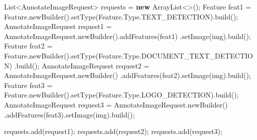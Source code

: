 \documentclass[
]{article}
\newenvironment{Shaded}{}{}
\newcommand{\BuiltInTok}[1]{\textcolor[rgb]{0.00,0.50,0.00}{#1}}
\newcommand{\FunctionTok}[1]{\textcolor[rgb]{0.02,0.16,0.49}{#1}}
\newcommand{\KeywordTok}[1]{\textcolor[rgb]{0.00,0.44,0.13}{\textbf{#1}}}
\newcommand{\NormalTok}[1]{#1}
\newcommand{\OperatorTok}[1]{\textcolor[rgb]{0.40,0.40,0.40}{#1}}
\begin{document}
\begin{Shaded}
\begin{Highlighting}[]
\BuiltInTok{List}\OperatorTok{\textless{}}\NormalTok{AnnotateImageRequest}\OperatorTok{\textgreater{}}\NormalTok{ requests }\OperatorTok{=} \KeywordTok{new} \BuiltInTok{ArrayList}\OperatorTok{\textless{}\textgreater{}();}
\NormalTok{Feature feat1 }\OperatorTok{=}\NormalTok{ Feature}\OperatorTok{.}\FunctionTok{newBuilder}\OperatorTok{().}\FunctionTok{setType}\OperatorTok{(}\NormalTok{Feature}\OperatorTok{.}\FunctionTok{Type}\OperatorTok{.}\FunctionTok{TEXT\_DETECTION}\OperatorTok{).}\FunctionTok{build}\OperatorTok{();}
\NormalTok{AnnotateImageRequest request1 }\OperatorTok{=}
\NormalTok{        AnnotateImageRequest}\OperatorTok{.}\FunctionTok{newBuilder}\OperatorTok{().}\FunctionTok{addFeatures}\OperatorTok{(}\NormalTok{feat1}\OperatorTok{)}
             \OperatorTok{.}\FunctionTok{setImage}\OperatorTok{(}\NormalTok{img}\OperatorTok{).}\FunctionTok{build}\OperatorTok{();}
\NormalTok{Feature feat2 }\OperatorTok{=}\NormalTok{ Feature}\OperatorTok{.}\FunctionTok{newBuilder}\OperatorTok{().}\FunctionTok{setType}\OperatorTok{(}\NormalTok{Feature}\OperatorTok{.}\FunctionTok{Type}\OperatorTok{.}\FunctionTok{DOCUMENT\_TEXT\_DETECTION}\OperatorTok{)}
             \OperatorTok{.}\FunctionTok{build}\OperatorTok{();}
\NormalTok{AnnotateImageRequest request2 }\OperatorTok{=}\NormalTok{ AnnotateImageRequest}\OperatorTok{.}\FunctionTok{newBuilder}\OperatorTok{()}
        \OperatorTok{.}\FunctionTok{addFeatures}\OperatorTok{(}\NormalTok{feat2}\OperatorTok{).}\FunctionTok{setImage}\OperatorTok{(}\NormalTok{img}\OperatorTok{).}\FunctionTok{build}\OperatorTok{();}
\NormalTok{Feature feat3 }\OperatorTok{=}\NormalTok{ Feature}\OperatorTok{.}\FunctionTok{newBuilder}\OperatorTok{().}\FunctionTok{setType}\OperatorTok{(}\NormalTok{Feature}\OperatorTok{.}\FunctionTok{Type}\OperatorTok{.}\FunctionTok{LOGO\_DETECTION}\OperatorTok{).}\FunctionTok{build}\OperatorTok{();}
\NormalTok{AnnotateImageRequest request3 }\OperatorTok{=}\NormalTok{ AnnotateImageRequest}\OperatorTok{.}\FunctionTok{newBuilder}\OperatorTok{()}
        \OperatorTok{.}\FunctionTok{addFeatures}\OperatorTok{(}\NormalTok{feat3}\OperatorTok{).}\FunctionTok{setImage}\OperatorTok{(}\NormalTok{img}\OperatorTok{).}\FunctionTok{build}\OperatorTok{();}

\NormalTok{requests}\OperatorTok{.}\FunctionTok{add}\OperatorTok{(}\NormalTok{request1}\OperatorTok{);}
\NormalTok{requests}\OperatorTok{.}\FunctionTok{add}\OperatorTok{(}\NormalTok{request2}\OperatorTok{);}
\NormalTok{requests}\OperatorTok{.}\FunctionTok{add}\OperatorTok{(}\NormalTok{request3}\OperatorTok{);}
\end{Highlighting}
\end{Shaded}
\end{document}
